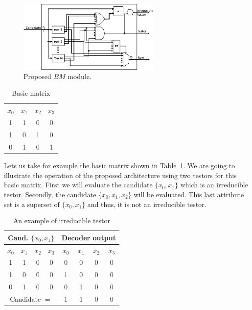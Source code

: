 \documentclass[conference]{IEEEtran}
\begin{document}
\begin{figure}[htb]
    \centering
	\includegraphics[width=7cm]{BM_module_new.eps}
	\caption{Proposed $BM$ module.}
	\label{figBMnew}
\end{figure}

\begin{table}[htb]
	\renewcommand{\arraystretch}{1.3}
	\caption{Basic matrix}
	\label{tabBM}
	\centering
	\begin{tabular}{cccc}
	 	\hline                       
	  	$x_0$ & $x_1$ & $x_2$ & $x_3$\\
	  	\hline
	  	1 & 1 & 0 & 0 \\
	  	1 & 0 & 1 & 0 \\
	  	0 & 1 & 0 & 1 \\
	 	\hline 
	\end{tabular}
\end{table}

Lets us take for example the basic matrix shown in Table~\ref{tabBM}. We are going to illustrate the 
operation of the proposed architecture using two testors for this basic matrix. First we will evaluate 
the candidate $\{x_0,x_1\}$ which is an irreducible testor. Secondly, the candidate $\{x_0,x_1,x_2\}$ will 
be evaluated. This last attribute set is a superset of $\{x_0,x_1\}$ and thus, it is not an irreducible testor.


\begin{table}[htb]
	\renewcommand{\arraystretch}{1.3}
	\caption{An example of irreducible testor}
	\label{tabIrreducible}
	\centering
	\begin{tabular}{cccc|cccc}
	 	\hline                       
  		\multicolumn{4}{c|}{Cand. $\{x_0, x_1\}$} & 
  		\multicolumn{4}{c}{Decoder output} \\
  		\hline
		$x_0$ & $x_1$ & $x_2$ & $x_3$ &
  		$x_0$ & $x_1$ & $x_2$ & $x_3$\\
  		\hline
  		1 & 1 & 0 & 0 & 0 & 0 & 0 & 0\\
  		1 & 0 & 0 & 0 & 1 & 0 & 0 & 0\\
  		0 & 1 & 0 & 0 & 0 & 1 & 0 & 0\\
  		\hline  
  		\multicolumn{4}{c|}{Candidate $=$} & 1 & 1 & 0 & 0\\
  		\hline  
	\end{tabular}
\end{table}
\end{document}
